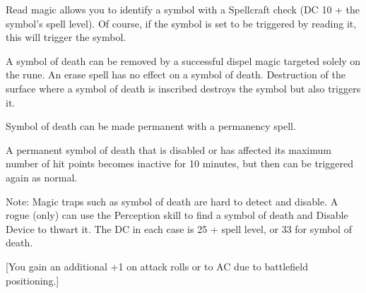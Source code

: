 {Read magic allows you to identify a symbol with a Spellcraft check (DC 10 + the symbol's spell level). Of course, if the symbol is set to be triggered by reading it, this will trigger the symbol.

A symbol of death can be removed by a successful dispel magic targeted solely on the rune. An erase spell has no effect on a symbol of death. Destruction of the surface where a symbol of death is inscribed destroys the symbol but also triggers it.

Symbol of death can be made permanent with a permanency spell.

A permanent symbol of death that is disabled or has affected its maximum number of hit points becomes inactive for 10 minutes, but then can be triggered again as normal.

Note: Magic traps such as symbol of death are hard to detect and disable. A rogue (only) can use the Perception skill to find a symbol of death and Disable Device to thwart it. The DC in each case is 25 + spell level, or 33 for symbol of death.}
        
[You gain an additional +1 on attack rolls or to AC due to battlefield positioning.]
        
